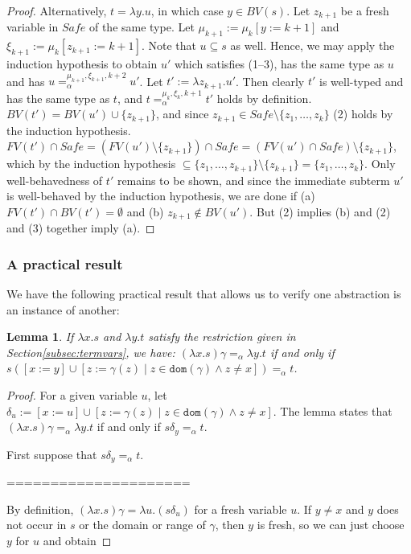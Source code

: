 \documentclass{lmcs}
\theoremstyle{theorem}\newtheorem{theorem}[dummy]{Theorem}
\theoremstyle{theorem}\newtheorem{lemma}[dummy]{Lemma}
\theoremstyle{theorem}\newtheorem{corollary}[dummy]{Corollary}
\theoremstyle{definition}\newtheorem{definition}[dummy]{Definition}
\theoremstyle{definition}\newtheorem{example}[dummy]{Example}
\newcommand{\FV}{\mathit{FV}}
\newcommand{\BV}{\mathit{BV}}
\newcommand{\domain}{\mathtt{dom}}
\newcommand{\bvar}{y}
\newcommand{\cvar}{z}
\newcommand{\abs}[2]{\lambda #1.#2}
\begin{document}
\begin{proof}
Alternatively, $t = \abs{\bvar}{u}$, in which case $\bvar \in \BV(s)$.  Let $\cvar_{k+1}$ be a
fresh variable in $\mathit{Safe}$ of the same type.  Let $\mu_{k+1} := \mu_k[\bvar := k+1]$ and
$\xi_{k+1} := \mu_k[\cvar_{k+1}:=k+1]$.  Note that $u \subseteq s$ as well.  Hence, we may
apply the induction hypothesis to obtain $u'$ which satisfies (1--3), has the same type as $u$
and has $u =_\alpha^{\mu_{k+1},\xi_{k+1},k+2} u'$.  Let $t' := \abs{\cvar_{k+1}}{u'}$.  Then
clearly $t'$ is well-typed and has the same type as $t$, and $t =_\alpha^{\mu_k,\xi_k,k+1} t'$
holds by definition.  $\BV(t') = \BV(u') \cup \{\cvar_{k+1}\}$, and since $\cvar_{k+1} \in
\mathit{Safe} \setminus \{\cvar_1,\dots,\cvar_k\}$ (2) holds by the induction hypothesis.
$\FV(t') \cap \mathit{Safe} = (\FV(u') \setminus \{ \cvar_{k+1} \}) \cap \mathit{Safe} =
(\FV(u') \cap \mathit{Safe}) \setminus \{\cvar_{k+1}\}$, which by the induction hypothesis
$\subseteq \{\cvar_1,\dots,\cvar_{k+1}\} \setminus \{\cvar_{k+1}\} = \{\cvar_1,\dots,\cvar_k\}$.
Only well-behavedness of $t'$ remains to be shown, and since the immediate subterm $u'$ is
well-behaved by the induction hypothesis, we are done if (a) $\FV(t') \cap \BV(t') = \emptyset$
and (b) $\cvar_{k+1} \notin \BV(u')$.  But (2) implies (b) and (2) and (3) together imply (a).
\end{proof}



\subsubsection{A practical result}

We have the following practical result that allows us to verify one abstraction is an instance of
another:

\begin{lemma}
If $\abs{x}{s}$ and $\abs{y}{t}$ satisfy the restriction given in Section\ref{subsec:termvars}, we
have:
$(\abs{x}{s})\gamma =_\alpha \abs{y}{t}$ if and only if
$s ([x:=y] \cup [z:=\gamma(z) \mid z \in \domain(\gamma) \wedge z \neq x]) =_\alpha t$.
\end{lemma}

\begin{proof}
For a given variable $u$, let $\delta_u := [x:=u] \cup [z:=\gamma(z) \mid z \in \domain(\gamma)
\wedge z \neq x]$.  The lemma states that $(\abs{x}{s})\gamma =_\alpha \abs{y}{t}$ if and only if
$s\delta_y =_\alpha t$.

First suppose that $s\delta_y =_\alpha t$.

=====================

By definition, $(\abs{x}{s})\gamma = \abs{u}{(s\delta_u)}$ for a fresh variable $u$.  If $y \neq x$
and $y$ does not occur in $s$ or the domain or range of $\gamma$, then $y$ is fresh, so we can just
choose $y$ for $u$ and obtain
\end{proof}
\end{document}
